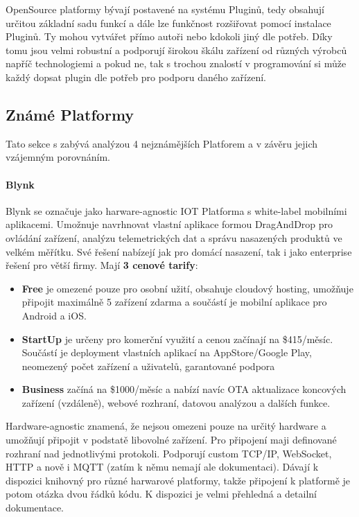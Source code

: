 \documentclass[thesis=B,czech]{FITthesis}[2019/12/23]
\begin{document}
OpenSource platformy bývají postavené na systému Pluginů, tedy obsahují určitou základní sadu funkcí a dále lze funkčnost rozšiřovat pomocí instalace Pluginů. Ty mohou vytvářet přímo autoři nebo kdokoli jiný dle potřeb. Díky tomu jsou velmi robustní a podporují širokou škálu zařízení od různých výrobců napříč technologiemi a pokud ne, tak s trochou znalostí v programování si může každý dopsat plugin dle potřeb pro podporu daného zařízení.
 

\subsection{Známé Platformy}  %
Tato sekce s zabývá analýzou 4 nejznámějších Platforem a v závěru jejich vzájemným porovnáním.

\paragraph{Blynk}
Blynk se označuje jako harware-agnostic IOT Platforma s white-label mobilními aplikacemi. Umožnuje navrhnovat vlastní aplikace formou DragAndDrop pro ovládání zařízení, analýzu telemetrických dat a správu nasazených produktů ve velkém měřítku. Své řešení nabízejí jak pro domácí nasazení, tak i jako enterprise řešení pro větší firmy. Mají \textbf{3 cenové tarify}:
\begin{itemize}
\item \textbf{Free} je omezené pouze pro osobní užití, obsahuje cloudový hosting, umožňuje připojit maximálně 5 zařízení zdarma a součástí je mobilní aplikace pro Android a iOS.
\item \textbf{StartUp} je určeny pro komerční využití a cenou začínají na \$415/měsíc. Součástí je deployment vlastních aplikací na AppStore/Google Play, neomezený počet zařízení a uživatelů, garantované podpora
\item \textbf{Business} začíná na \$1000/měsíc a nabízí navíc OTA aktualizace koncových zařízení (vzdáleně), webové rozhraní, datovou analýzou a dalších funkce.
\end{itemize}

Hardware-agnostic znamená, že nejsou omezeni pouze na určitý hardware a umožňují připojit v podstatě libovolné zařízení. Pro připojení maji definované rozhraní nad jednotlivými protokoli. Podporují custom TCP/IP, WebSocket, HTTP a nově i MQTT (zatím k němu nemají ale dokumentaci). Dávají k dispozici knihovný pro různé harwarové platformy, takže připojení k platformě je potom otázka dvou řádků kódu. K dispozici je velmi přehledná a detailní dokumentace.
\end{document}
